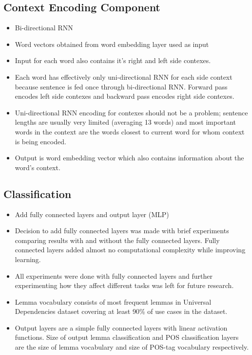 \documentclass[12pt,a4paper,english
]{tutthesis}
\begin{document}
\subsection{Context Encoding Component}
\label{ss:context_encoding_component}
\begin{itemize}
\item Bi-directional RNN
\item Word vectors obtained from word embedding layer used as input
\item Input for each word also contains it's right and left side contexes.
\item Each word has effectively only uni-directional RNN for each side context because sentence is fed once through bi-directional RNN. Forward pass encodes left side contexes and backward pass encodes right side contexes.
\item Uni-directional RNN encoding for contexes should not be a problem; sentence lengths are usually very limited (averaging 13 words) and most important words in the context are the words closest to current word for whom context is being encoded.
\item Output is word embedding vector which also contains information about the word's context.
\end{itemize}

\subsection{Classification}
\label{ss:classification}
\begin{itemize}
\item Add fully connected layers and output layer (MLP)
\item Decision to add fully connected layers was made with brief experiments comparing results with and without the fully connected layers. Fully connected layers added almost no computational complexity while improving learning.
\item All experiments were done with fully connected layers and further experimenting how they affect different tasks was left for future research.
\item Lemma vocabulary consists of most frequent lemmas in Universal Dependencies dataset covering at least 90\% of use cases in the dataset.
\item Output layers are a simple fully connected layers with linear activation functions. Size of output lemma classification and POS classification layers are the size of lemma vocabulary and size of POS-tag vocabulary respectively.
\end{itemize}
\end{document}

